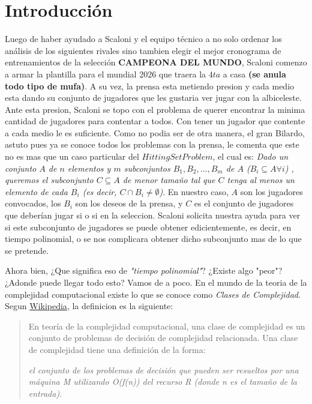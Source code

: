 \section{Introducción}

Luego de haber ayudado a Scaloni y el equipo técnico a no solo ordenar los análisis de los siguientes rivales sino tambien elegir el mejor cronograma de entrenamientos de la selección \textbf{CAMPEONA DEL MUNDO}, Scaloni comenzo a armar la plantilla para el mundial 2026 que traera la $4ta$ a casa \textbf{(se anula todo tipo de mufa)}. A su vez, la prensa esta metiendo presion y cada medio esta dando su conjunto de jugadores que les gustaria ver jugar con la albiceleste. Ante esta presion, Scaloni se topo con el problema de querer encontrar la minima cantidad de jugadores para contentar a todos. Con tener un jugador que contente a cada medio le es suficiente.
Como no podia ser de otra manera, el gran Bilardo, astuto pues ya se conoce todos los problemas con la prensa, le comenta que este no es mas que un caso particular del $Hitting Set Problem$, el cual es:
\textit{Dado un conjunto $A$ de $n$ elementos y $m$ subconjuntos $B_1, B_2, ..., B_m$ de $A$ ($B_i \subseteq A \forall i$) , queremos el subconjunto $C \subseteq A$ de menor tamaño tal que $C$ tenga al menos un elemento de cada $B_i$ (es decir, $C \cap B_i \neq \emptyset$)}.
En nuestro caso, $A$ son los jugadores convocados, los $B_i$ son los deseos de la prensa, y $C$ es el conjunto de jugadores que deberían jugar si o si en la seleccion.
Scaloni solicita nuestra ayuda para ver si este subconjunto de jugadores se puede obtener edicientemente, es decir, en tiempo polinomial, o se nos complicara obtener dicho subconjunto mas de lo que se pretende.

Ahora bien, ¿Que significa eso de \textit{"tiempo polinomial"}? ¿Existe algo "peor"? ¿Adonde puede llegar todo esto? Vamos de a poco.
En el mundo de la teoria de la complejidad computacional existe lo que se conoce como \textit{Clases de Complejidad}. Segun \href{https://es.wikipedia.org/wiki/Clase_de_complejidad}{Wikipedia}, la definicion es la siguiente: 
\begin{quote}
En teoría de la complejidad computacional, una clase de complejidad es un conjunto de problemas de decisión de complejidad relacionada. Una clase de complejidad tiene una definición de la forma: 

\textit{el conjunto de los problemas de decisión que pueden ser resueltos por una máquina M utilizando O(f(n)) del recurso R (donde n es el tamaño de la entrada)}. 
\end{quote}

